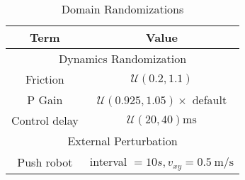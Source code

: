 \begin{table}[h]
    \centering
    \setlength{\tabcolsep}{3pt} %
    \caption{Domain Randomizations}
    \begin{tabular}{cc}
        \toprule
        Term & Value \\
        \midrule
        \multicolumn{2}{c}{Dynamics Randomization} \\
        \midrule
        Friction & $\mathcal{U}(0.2,1.1)$ \\
        P Gain & $\mathcal{U}(0.925,1.05) \times$ default \\
        Control delay & $\mathcal{U}(20,40) \mathrm{ms}$ \\
        \midrule
        \multicolumn{2}{c}{External Perturbation} \\
        \midrule
        Push robot & interval $= 10 s, v_{x y} = 0.5 \mathrm{~m} / \mathrm{s}$ \\
        \bottomrule
    \end{tabular}
    \label{tab:deepmimic_DR}
\end{table}